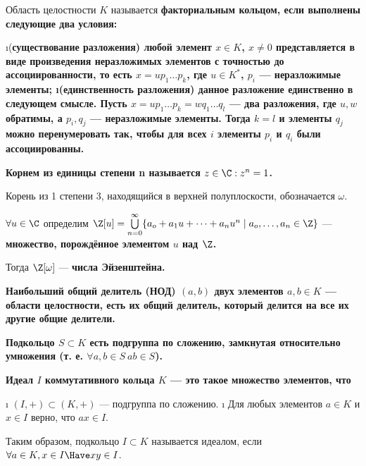 \begin{defn}
Область целостности \(K\) называется \bf{факториальным кольцом}, если выполнены следующие два условия:
\begin{enumerate}
\i (\bf{существование разложения}) любой элемент \(x \in K\), \(x \neq 0\) представляется в виде произведения неразложимых элементов с точностью до ассоциированности, то есть \(x = u p_1 \ldots p_k\), где \(u \in K^*\), \(p_i\) --- неразложимые элементы;
\i (\bf{единственность разложения}) данное разложение единственно в следующем смысле. Пусть \(x = u p_1 \ldots p_k = w q_1 \ldots q_l\) --- два разложения, где \(u,w\) обратимы, а \(p_i, q_j\) --- неразложимые элементы. Тогда \(k=l\) и элементы \(q_j\) можно перенумеровать так, чтобы для всех \(i\) элементы \(p_i\) и \(q_i\) были ассоциированны.
\end{enumerate}
\end{defn}

\begin{defn}
\bf{Корнем из единицы степени n} называется \(z \in \C: z^n=1\).

Корень из 1 степени 3, находящийся в верхней полуплоскости, обозначается \(\omega\).

\(\forall u \in \C\) определим \(\Z[u] = \bigcup\limits_{n=0}^\infty \{a_o+a_1u+\dots+a_nu^n \mid a_o, \dots, a_n \in \Z \}\) --- \bf{множество, порождённое элементом \(u\) над \(\Z\)}.

Тогда \(\Z[\omega]\) --- \bf{числа Эйзенштейна}.
\end{defn}

\begin{defn}
\bf{Наибольший общий делитель (НОД)} \((a, b)\) двух элементов \(a, b \in K\) --- области целостности, есть их общий делитель, который делится на все их другие общие делители.
\end{defn}

\begin{defn}
\bf{Подкольцо} \(S \subset K\) есть подгруппа по сложению, замкнутая относительно умножения (т. е. \(\forall a, b \in S \ ab \in S\)).
\end{defn}

\begin{defn}
\bf{Идеал} \(I\) коммутативного кольца \(K\) --- это такое множество элементов, что

\begin{enumerate}
\def\labelenumi{\arabic{enumi}.}
\tightlist
\i
  \((I,+) \subset (K,+)\) --- подгруппа по сложению.
\i
  Для любых элементов \(a\in K\) и \(x \in I\) верно, что \(ax \in I\).
\end{enumerate}

Таким образом, подкольцо \(I \subset K\) называется идеалом, если \(\forall a\in K, x \in I \Have xy \in I\).
\end{defn}


